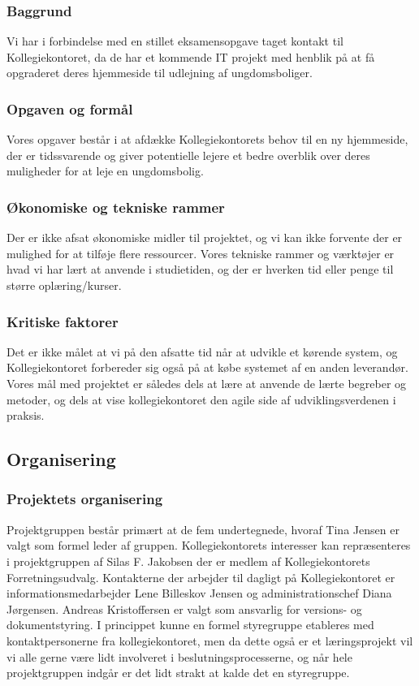 \documentclass[12pt, a4paper]{report}
\begin{document}
\subsubsection{Baggrund}
Vi har i forbindelse med en stillet eksamensopgave taget kontakt til Kollegiekontoret, da de har et kommende IT projekt med henblik på at få opgraderet deres hjemmeside til udlejning af ungdomsboliger.

\subsubsection{Opgaven og formål}
Vores opgaver består i at afdække Kollegiekontorets behov til en ny hjemmeside, der er tidssvarende og giver potentielle lejere et bedre overblik over deres muligheder for at leje en ungdomsbolig.

\subsubsection{Økonomiske og tekniske rammer}
Der er ikke afsat økonomiske midler til projektet, og vi kan ikke forvente der er mulighed for at tilføje flere ressourcer. Vores tekniske rammer og værktøjer er hvad vi har lært at anvende i studietiden, og der er hverken tid eller penge til større oplæring/kurser.

\subsubsection{Kritiske faktorer}
Det er ikke målet at vi på den afsatte tid når at udvikle et kørende system, og Kollegiekontoret forbereder sig også på at købe systemet af en anden leverandør. Vores mål med projektet er således dels at lære at anvende de lærte begreber og metoder, og dels at vise kollegiekontoret den agile side af udviklingsverdenen i praksis.

\subsection{Organisering}
\subsubsection{Projektets organisering}
Projektgruppen består primært at de fem undertegnede, hvoraf Tina Jensen er valgt som formel leder af gruppen. Kollegiekontorets interesser kan repræsenteres i projektgruppen af Silas F. Jakobsen der er medlem af Kollegiekontorets Forretningsudvalg. Kontakterne der arbejder til dagligt på Kollegiekontoret er informationsmedarbejder Lene Billeskov Jensen og administrationschef Diana Jørgensen. Andreas Kristoffersen er valgt som ansvarlig for versions- og dokumentstyring.
I princippet kunne en formel styregruppe etableres med kontaktpersonerne fra kollegiekontoret, men da dette også er et læringsprojekt vil vi alle gerne være lidt involveret i beslutningsprocesserne, og når hele projektgruppen indgår er det lidt strakt at kalde det en styregruppe.
\end{document}
